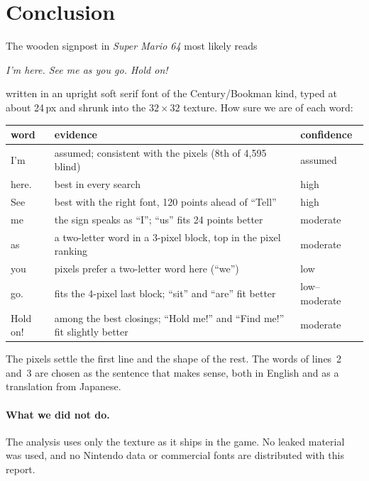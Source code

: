 \documentclass[10pt,a4paper]{article}
\newcommand{\q}[1]{``#1''}
\begin{document}
\section{Conclusion}
\label{sec:conclusion}
The wooden signpost in \emph{Super Mario 64} most likely reads
\begin{center}\Large\textit{I'm here. See me as you go. Hold on!}\end{center}
written in an upright soft serif font of the Century/Bookman kind, typed at about 24\,px and shrunk into the
$32{\times}32$ texture. How sure we are of each word:
\begin{center}\small\begin{tabular}{lp{9.5cm}l}\toprule
word & evidence & confidence\\\midrule
I'm & assumed; consistent with the pixels (8th of 4{,}595 blind) & assumed\\
here. & best in every search & high\\
See & best with the right font, 120 points ahead of \q{Tell} & high\\
me & the sign speaks as \q{I}; \q{us} fits 24 points better & moderate\\
as & a two-letter word in a 3-pixel block, top in the pixel ranking & moderate\\
you & pixels prefer a two-letter word here (\q{we}) & low\\
go. & fits the 4-pixel last block; \q{sit} and \q{are} fit better & low--moderate\\
Hold on! & among the best closings; \q{Hold me!} and \q{Find me!} fit slightly better & moderate\\
\bottomrule\end{tabular}\end{center}
The pixels settle the first line and the shape of the rest. The words of lines~2 and~3 are chosen as the sentence that
makes sense, both in English and as a translation from Japanese.

\paragraph{What we did not do.}
The analysis uses only the texture as it ships in the game. No leaked material was used, and no Nintendo data or
commercial fonts are distributed with this report.
\end{document}
